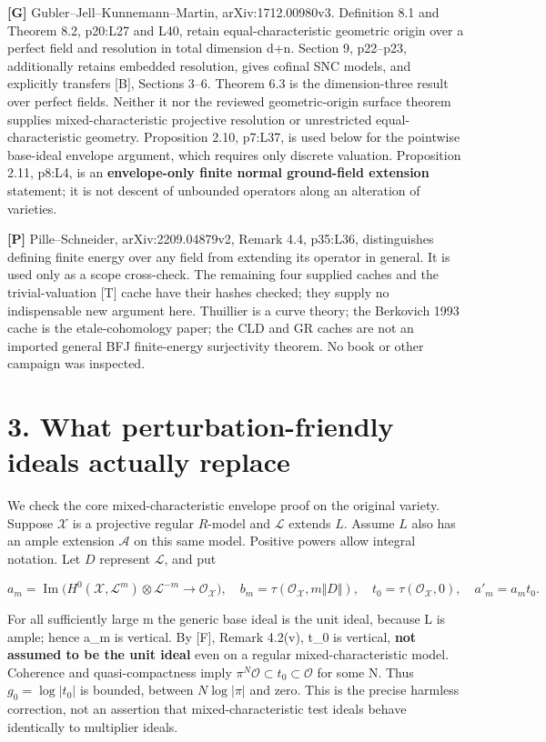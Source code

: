 \documentclass[11pt]{article}
\begin{document}
\noindent \textbf{[G]} Gubler--Jell--Kunnemann--Martin, arXiv:1712.00980v3. Definition 8.1 and Theorem 8.2, p20:L27 and L40, retain equal-characteristic geometric origin over a perfect field and resolution in total dimension d+n. Section 9, p22--p23, additionally retains embedded resolution, gives cofinal SNC models, and explicitly transfers [B], Sections 3--6. Theorem 6.3 is the dimension-three result over perfect fields. Neither it nor the reviewed geometric-origin surface theorem supplies mixed-characteristic projective resolution or unrestricted equal-characteristic geometry. Proposition 2.10, p7:L37, is used below for the pointwise base-ideal envelope argument, which requires only discrete valuation. Proposition 2.11, p8:L4, is an \textbf{envelope-only finite normal ground-field extension} statement; it is not descent of unbounded operators along an alteration of varieties.

\noindent \textbf{[P]} Pille--Schneider, arXiv:2209.04879v2, Remark 4.4, p35:L36, distinguishes defining finite energy over any field from extending its operator in general. It is used only as a scope cross-check. The remaining four supplied caches and the trivial-valuation [T] cache have their hashes checked; they supply no indispensable new argument here. Thuillier is a curve theory; the Berkovich 1993 cache is the etale-cohomology paper; the CLD and GR caches are not an imported general BFJ finite-energy surjectivity theorem. No book or other campaign was inspected.

\section*{3. What perturbation-friendly ideals actually replace}

We check the core mixed-characteristic envelope proof on the original variety. Suppose \(\mathscr X\) is a projective regular \(R\)-model and \(\mathscr L\) extends \(L\). Assume \(L\) also has an ample extension \(\mathscr A\) on this same model. Positive powers allow integral notation. Let \(D\) represent \(\mathscr L\), and put

\[
a_m=\operatorname{Im}\bigl(H^0(\mathscr X,\mathscr L^m)\otimes\mathscr L^{-m}\to\mathcal O_{\mathscr X}\bigr),
\quad b_m=\tau(\mathcal O_{\mathscr X},m\Vert D\Vert),
\quad t_0=\tau(\mathcal O_{\mathscr X},0),\quad a'_m=a_mt_0.
\]

For all sufficiently large m the generic base ideal is the unit ideal, because L is ample; hence a\_m is vertical. By [F], Remark 4.2(v), t\_0 is vertical, \textbf{not assumed to be the unit ideal} even on a regular mixed-characteristic model. Coherence and quasi-compactness imply \(\pi^N\mathcal O\subset t_0\subset\mathcal O\) for some N. Thus \(g_0=\log|t_0|\) is bounded, between \(N\log|\pi|\) and zero. This is the precise harmless correction, not an assertion that mixed-characteristic test ideals behave identically to multiplier ideals.
\end{document}
